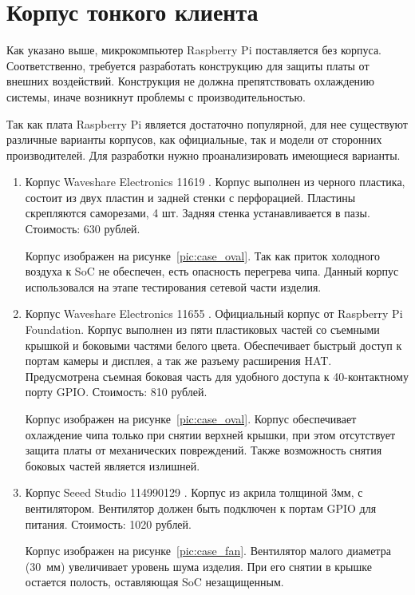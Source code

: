 \section{Корпус тонкого клиента}

Как указано выше, микрокомпьютер Raspberry Pi поставляется без корпуса. Соответственно,
требуется разработать конструкцию для защиты платы от внешних воздействий. Конструкция
не должна препятствовать охлаждению системы, иначе возникнут проблемы с
производительностью.

Так как плата Raspberry Pi является достаточно популярной, для нее существуют различные
варианты корпусов, как официальные, так и модели от сторонних производителей. Для
разработки нужно проанализировать имеющиеся варианты.

\begin{enumerate}
    \item Корпус Waveshare Electronics 11619 \cite{ref:case_oval}. Корпус выполнен из
        черного пластика, состоит из двух пластин и задней стенки с перфорацией.
        Пластины скрепляются саморезами, 4 шт. Задняя стенка устанавливается в пазы.
        Стоимость: 630 рублей.

        Корпус изображен на рисунке~\ref{pic:case_oval}.
        Так как приток холодного воздуха к SoC не обеспечен, есть опасность перегрева
        чипа. Данный корпус использовался на этапе тестирования сетевой части изделия.

    \item Корпус Waveshare Electronics 11655 \cite{ref:case_off}. Официальный корпус от
        Raspberry Pi Foundation. Корпус выполнен из пяти пластиковых частей со съемными
        крышкой и боковыми частями белого цвета.  Обеспечивает быстрый доступ к портам
        камеры и дисплея, а так же разъему расширения HAT. Предусмотрена съемная боковая
        часть для удобного доступа к 40-контактному порту GPIO.
        Стоимость: 810 рублей.

        Корпус изображен на рисунке~\ref{pic:case_oval}.
        Корпус обеспечивает охлаждение чипа только при снятии верхней крышки, при этом
        отсутствует защита платы от механических повреждений. Также возможность снятия
        боковых частей является излишней.
        
    \item Корпус Seeed Studio 114990129 \cite{ref:case_fan}.
        Корпус из акрила толщиной 3мм, с вентилятором. Вентилятор должен быть подключен
        к портам GPIO для питания.
        Стоимость: 1020 рублей.

        Корпус изображен на рисунке~\ref{pic:case_fan}.
        Вентилятор малого диаметра (30~мм) увеличивает уровень шума изделия. При его
        снятии в крышке остается полость, оставляющая SoC незащищенным.
\end{enumerate}

